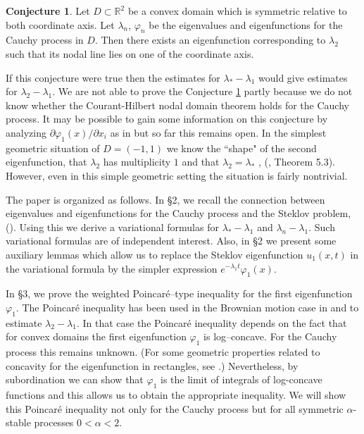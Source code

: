 \documentclass[11pt,leqno]{article}
\theoremstyle{definition}
\newtheorem{conj}{Conjecture}[section]
\newcommand{\Rt}{\mathbb{R}^2}
\numberwithin{equation}{section}
\begin{document}
\begin{conj}
\label{hyp1}
Let $D \subset \Rt$ be a convex   domain which is
symmetric relative to both coordinate axis. Let $\lambda_n$,
$\varphi_n$ be the eigenvalues and eigenfunctions 
for the Cauchy process in $D$.  Then there exists an eigenfunction
 corresponding to $\lambda_2$ such that its nodal line lies on one of the coordinate axis. 
\end{conj}



 If this conjecture were  true then the estimates for $\lambda_* -
\lambda_1$ would give estimates for $\lambda_2 - \lambda_1$. 
We are not able to prove the Conjecture \ref{hyp1} partly because we do not know whether the
 Courant-Hilbert nodal domain theorem holds for the Cauchy process. 
 It may be possible to gain some information on this conjecture 
 by analyzing $\partial \varphi_1(x)/\partial x_i$  as in \cite{P1} but so far this remains open. 
In the simplest geometric situation of  $D = (-1,1)$ we know the ``shape" of the second
eigenfunction, that  $\lambda_2$ has
multiplicity $1$  and  that $\lambda_2 = \lambda_*$ , (\cite{BK}, Theorem 5.3). However,
even in this simple geometric setting the  situation is fairly nontrivial. 



The paper is organized as follows. In \S2, we recall  the
connection between eigenvalues and eigenfunctions for the
Cauchy process and the Steklov problem, (\cite{BK}).   Using this we
derive a variational formulas for $\lambda_* - \lambda_1$ and $\lambda_n
- \lambda_1$. Such variational formulas are of independent
interest. Also, in \S2 we present some auxiliary  lemmas which allow us to replace the Steklov eigenfunction $u_1(x,t)$ in the variational formula by the simpler expression $e^{- \lambda_1 t} \varphi_1(x)$. 



In \S3, we prove the weighted Poincar\'e--type inequality for the first eigenfunction $\varphi_1$. The
Poincar\'e inequality has been used in the Brownian motion case  in \cite{SWY} and \cite{Sm} 
 to estimate $\lambda_2
-\lambda_1$.  In that case the Poincar\'e  inequality  depends on the fact that 
for convex domains the first eigenfunction $\varphi_1$ is log--concave. 
For the  Cauchy process this remains unknown. (For some geometric properties related to
concavity for the eigenfunction in rectangles, see \cite{BKM}.)
 Nevertheless, by subordination we can show that
$\varphi_1$ is the limit of integrals of log-concave functions and this 
allows us to obtain the appropriate inequality. We will show this Poincar\'e inequality not only for the Cauchy
process but for all symmetric $\alpha$-stable processes $0 < \alpha < 2$.
\end{document}
